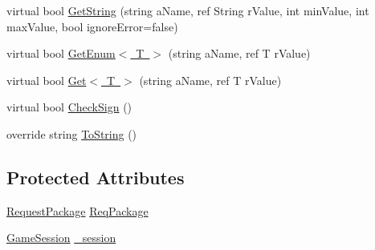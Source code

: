 \begin{DoxyCompactItemize}
\item 
virtual bool \mbox{\hyperlink{class_t_net_1_1_service_1_1_action_getter_acf7a917329a995f0ae9ba3977db3cbf0}{Get\+String}} (string a\+Name, ref String r\+Value, int min\+Value, int max\+Value, bool ignore\+Error=false)
\item 
virtual bool \mbox{\hyperlink{class_t_net_1_1_service_1_1_action_getter_aceae772830322b5f8ab88b31d8b31835}{Get\+Enum$<$ T $>$}} (string a\+Name, ref T r\+Value)
\item 
virtual bool \mbox{\hyperlink{class_t_net_1_1_service_1_1_action_getter_a1e62c4e643e9b9d0302275b6fa5d8ad1}{Get$<$ T $>$}} (string a\+Name, ref T r\+Value)
\item 
virtual bool \mbox{\hyperlink{class_t_net_1_1_service_1_1_action_getter_afd79de3801d7a69f32ba85c62f45a774}{Check\+Sign}} ()
\item 
override string \mbox{\hyperlink{class_t_net_1_1_service_1_1_action_getter_aa78cf74b2f6a3a46d6e78b32c0c70921}{To\+String}} ()
\end{DoxyCompactItemize}
\subsection*{Protected Attributes}
\begin{DoxyCompactItemize}
\item 
\mbox{\hyperlink{class_t_net_1_1_contract_1_1_request_package}{Request\+Package}} \mbox{\hyperlink{class_t_net_1_1_service_1_1_action_getter_ab526280622af09b38dc81008eb5db6e3}{Req\+Package}}
\item 
\mbox{\hyperlink{class_t_net_1_1_contract_1_1_game_session}{Game\+Session}} \mbox{\hyperlink{class_t_net_1_1_service_1_1_action_getter_aff7ee1d03bbe8d5c60b6d1400b5ee9c1}{\+\_\+session}}
\end{DoxyCompactItemize}
